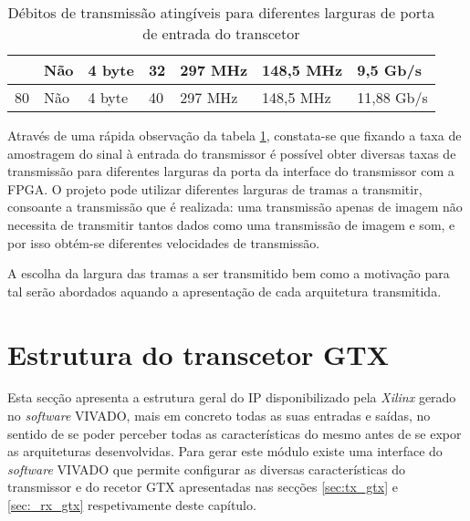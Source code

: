 \begin{table}[h!]
{\begin{tabular}{@{}lllllll@{}}
			& Não                                                                    & 4 byte                                                                  & 32                                                                                 & 297 MHz                & 148,5 MHz               & 9,5 Gb/s                                                                \\ \hline
			80                                                                         & Não                                                                    & 4 byte                                                                  & 40                                                                                 & 297 MHz                & 148,5 MHz               & 11,88 Gb/s                                                              \\ \toprule
		\end{tabular}%
	}
	\caption[Débitos de transmissão atingíveis para diferentes larguras de porta de entrada do transcetor]{Débitos de transmissão atingíveis para diferentes larguras de porta de entrada do transcetor}
	\label{table:line_rates}
\end{table}


Através de uma rápida observação da tabela \ref{table:line_rates}, constata-se que fixando a taxa de amostragem do sinal à entrada do transmissor é possível obter diversas taxas de transmissão para diferentes larguras da porta da interface do transmissor com a FPGA. O projeto pode utilizar diferentes larguras de tramas a transmitir, consoante a transmissão que é realizada: uma transmissão apenas de imagem não necessita de transmitir tantos dados como uma transmissão de imagem e som, e por isso obtém-se diferentes velocidades de transmissão.

A escolha da largura das tramas a ser transmitido bem como a motivação para tal serão abordados aquando a apresentação de cada arquitetura transmitida.

\section{Estrutura do transcetor GTX}

Esta secção apresenta a estrutura geral do IP disponibilizado pela \textit{Xilinx} gerado no \textit{software} VIVADO, mais em concreto todas as suas entradas e saídas,  no sentido de se poder perceber todas as características do mesmo antes de se expor as arquiteturas desenvolvidas.  Para gerar este módulo existe uma interface do \textit{software} VIVADO que permite configurar as diversas características do transmissor e do recetor GTX apresentadas nas secções \ref{sec:tx_gtx} e \ref{sec:_rx_gtx} respetivamente deste capítulo. 

